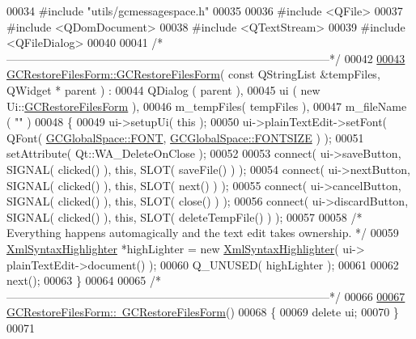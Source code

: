\begin{DoxyCode}
00034 \textcolor{preprocessor}{#include "utils/gcmessagespace.h"}
00035 
00036 \textcolor{preprocessor}{#include <QFile>}
00037 \textcolor{preprocessor}{#include <QDomDocument>}
00038 \textcolor{preprocessor}{#include <QTextStream>}
00039 \textcolor{preprocessor}{#include <QFileDialog>}
00040 
00041 \textcolor{comment}{/*
      --------------------------------------------------------------------------------------*/}
00042 
\hypertarget{gcrestorefilesform_8cpp_source_l00043}{}\hyperlink{class_g_c_restore_files_form_a0b736b8d4da5adb072e32ea188526634}{00043} \hyperlink{class_g_c_restore_files_form_a0b736b8d4da5adb072e32ea188526634}{GCRestoreFilesForm::GCRestoreFilesForm}( \textcolor{keyword}{const} QStringList &tempFiles, QWidget *
      parent ) :
00044   QDialog    ( parent ),
00045   ui         ( new Ui::\hyperlink{class_g_c_restore_files_form}{GCRestoreFilesForm} ),
00046   m\_tempFiles( tempFiles ),
00047   m\_fileName ( \textcolor{stringliteral}{""} )
00048 \{
00049   ui->setupUi( \textcolor{keyword}{this} );
00050   ui->plainTextEdit->setFont( QFont( \hyperlink{namespace_g_c_global_space_a9d7158c8a1dfcc867d85ee6b9c5c4810}{GCGlobalSpace::FONT}, 
      \hyperlink{namespace_g_c_global_space_ab9fa2f10bab070a4f59b7e3ef9166c86}{GCGlobalSpace::FONTSIZE} ) );
00051   setAttribute( Qt::WA\_DeleteOnClose );
00052 
00053   connect( ui->saveButton, SIGNAL( clicked() ), \textcolor{keyword}{this}, SLOT( saveFile() ) );
00054   connect( ui->nextButton, SIGNAL( clicked() ), \textcolor{keyword}{this}, SLOT( next() ) );
00055   connect( ui->cancelButton, SIGNAL( clicked() ), \textcolor{keyword}{this}, SLOT( close() ) );
00056   connect( ui->discardButton, SIGNAL( clicked() ), \textcolor{keyword}{this}, SLOT( deleteTempFile()
       ) );
00057 
00058   \textcolor{comment}{/* Everything happens automagically and the text edit takes ownership. */}
00059   \hyperlink{class_xml_syntax_highlighter}{XmlSyntaxHighlighter} *highLighter = \textcolor{keyword}{new} \hyperlink{class_xml_syntax_highlighter}{XmlSyntaxHighlighter}( ui->
      plainTextEdit->document() );
00060   Q\_UNUSED( highLighter );
00061 
00062   next();
00063 \}
00064 
00065 \textcolor{comment}{/*
      --------------------------------------------------------------------------------------*/}
00066 
\hypertarget{gcrestorefilesform_8cpp_source_l00067}{}\hyperlink{class_g_c_restore_files_form_a69ec217c50d53d5cb0cfbf7b7da56936}{00067} \hyperlink{class_g_c_restore_files_form_a69ec217c50d53d5cb0cfbf7b7da56936}{GCRestoreFilesForm::~GCRestoreFilesForm}()
00068 \{
00069   \textcolor{keyword}{delete} ui;
00070 \}
00071 

\end{DoxyCode}

